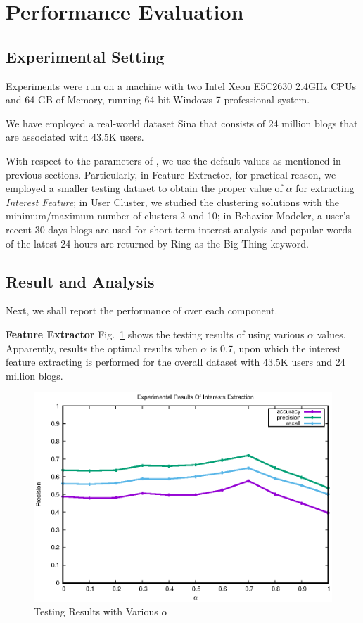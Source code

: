 \section{Performance Evaluation}
\label{sec:perf}

\subsection{Experimental Setting}

Experiments were run on a machine with two Intel Xeon E5C2630 2.4GHz CPUs and 64 GB of Memory, running 64 bit Windows 7 professional system. 

We have employed a real-world dataset Sina  that consists of 24 million blogs that are associated with 43.5K users. 

With respect to the parameters of \sys{}, we use the default values as mentioned in previous sections.
Particularly, in Feature Extractor, for practical reason, we employed a smaller testing dataset to obtain the proper value of $\alpha$ for extracting \textit{Interest Feature}; 
in User Cluster, we studied the clustering solutions with the minimum/maximum number of clusters 2 and 10;
in Behavior Modeler, a user's recent 30 days blogs are used for short-term interest analysis and popular words of the latest 24 hours are returned by Ring  as the Big Thing keyword.

\subsection{Result and Analysis}
Next, we shall report the performance of \sys{} over each component. 

\textbf{Feature Extractor}
%
Fig.\ \ref{fig:fe} shows the testing results of using various $\alpha$ values. 
Apparently, \sys{} results the optimal results when $\alpha$ is 0.7, upon which the interest feature extracting is performed for the overall dataset with 43.5K users and 24 million blogs.

\begin{figure}[!htb]
\centering
\includegraphics[width=.96\linewidth]{figures/Interests}
\caption{Testing Results with Various $\alpha$ \tbc{}}
\label{fig:fe}
\end{figure}


